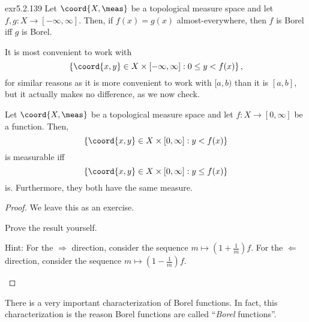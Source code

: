 \begin{exr}{}{exr5.2.139}
Let $\coord{X,\meas}$ be a topological measure space and let $f,g\colon X\rightarrow [-\infty ,\infty ]$.  Then, if $f(x)=g(x)$ almost-everywhere, then $f$ is Borel iff $g$ is Borel.
\end{exr}

It is most convenient to work with
\begin{equation}
\left\{ \coord{x,y}\in X\times [-\infty ,\infty ]:0\leq y<f(x)\right\} ,
\end{equation}
for similar reasons as it is more convenient to work with $[a,b)$ than it is $[a,b]$, but it actually makes no difference, as we now check.
\begin{prp}{}{}
Let $\coord{X,\meas}$ be a topological measure space and let $f\colon X\rightarrow [0,\infty ]$ be a function.  Then,
\begin{equation}
\left\{ \coord{x,y}\in X\times [0,\infty ]:y<f(x)\right\}
\end{equation}
is measurable iff
\begin{equation}
\left\{ \coord{x,y}\in X\times [0,\infty ]:y\leq f(x)\right\} 
\end{equation}
is.  Furthermore, they both have the same measure.
\begin{proof}
We leave this as an exercise.
\begin{exr}[breakable=false]{}{}
Prove the result yourself.
\begin{rmk}
Hint:  For the $\Rightarrow$ direction, consider the sequence $m\mapsto \left( 1+\frac{1}{m}\right) f$.  For the $\Leftarrow$ direction, consider the sequence $m\mapsto \left( 1-\frac{1}{m}\right) f$.
\end{rmk}
\end{exr}
\end{proof}
\end{prp}
There is a very important characterization of Borel functions.  In fact, this characterization is the reason Borel functions are called  ``\emph{Borel} functions''.
